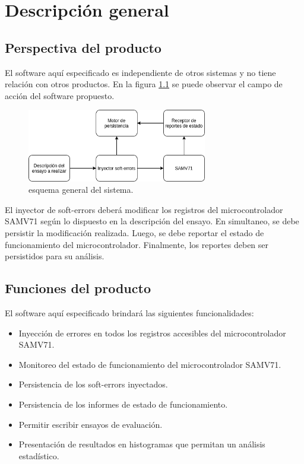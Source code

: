 \chapter{Descripción general}

\section{Perspectiva del producto}

El software aquí especificado es independiente de otros sistemas y no tiene relación con otros productos.
En la figura \ref{fig:esqGral} se puede observar el campo de acción del software propuesto.

\begin{figure}[h]
	\centering
	\includegraphics[width=0.7\textwidth]{./figuras/SISE.png}
	\caption{esquema general del sistema.}
	\label{fig:esqGral}
\end{figure}

El inyector de soft-errors deberá modificar los registros del microcontrolador SAMV71 según lo dispuesto en la descripción del ensayo.
En simultaneo, se debe persistir la modificación realizada.
Luego, se debe reportar el estado de funcionamiento del microcontrolador.
Finalmente, los reportes deben ser persistidos para su análisis.

\section{Funciones del producto}

El software aquí especificado brindará las siguientes funcionalidades:

\begin{itemize}
	\item Inyección de errores en todos los registros accesibles del microcontrolador SAMV71.
	\item Monitoreo del estado de funcionamiento del microcontrolador SAMV71.
	\item Persistencia de los soft-errors inyectados.
	\item Persistencia de los informes de estado de funcionamiento.
	\item Permitir escribir ensayos de evaluación.
	\item Presentación de resultados en histogramas que permitan un análisis estadístico.
\end{itemize}

